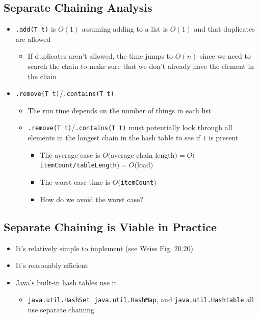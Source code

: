 \documentclass[10pt]{article}
\begin{document}
\subsection*{Separate Chaining Analysis}
\begin{itemize}
    \item \texttt{.add(T t)} is $O(1)$ assuming adding to a list is $O(1)$ and that duplicates are allowed
    \begin{itemize}
        \item If duplicates aren't allowed, the time jumps to $O(n)$ since we need to search the chain to make sure that we don't already have the element in the chain
    \end{itemize}
    \item \texttt{.remove(T t)}/\texttt{.contains(T t)}
    \begin{itemize}
        \item The run time depends on the number of things in each list
        \item \texttt{.remove(T t)}/\texttt{.contains(T t)} must potentially look through all elements in the longest chain in the hash table to see if \texttt{t} is present
        \begin{itemize}
            \item The average case is $O($average chain length$)= O($\texttt{itemCount/tableLength}$)=O($load$)$
            \item The worst case time is $O($\texttt{itemCount}$)$
            \item How do we avoid the worst case?
        \end{itemize}
    \end{itemize}
\end{itemize}

\subsection*{Separate Chaining is Viable in Practice}
\begin{itemize}
    \item It's relatively simple to implement (see Weiss Fig. 20.20)
    \item It's reasonably efficient
    \item Java's built-in hash tables use it
    \begin{itemize}
        \item \texttt{java.util.HashSet}, \texttt{java.util.HashMap}, and \texttt{java.util.Hashtable} all use separate chaining
    \end{itemize}
\end{itemize}
\end{document}

